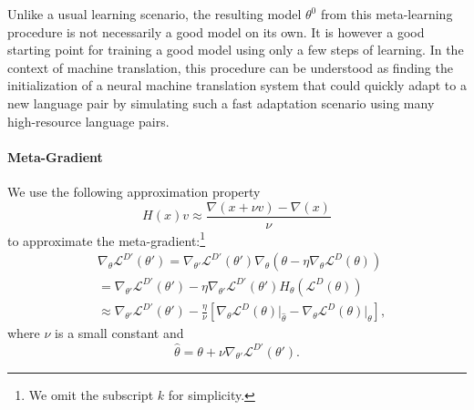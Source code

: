 Unlike a usual learning scenario, the resulting model $\theta^0$ from this meta-learning procedure is not necessarily a good model on its own. It is however a good starting point for training a good model using only a few steps of learning. In the context of machine translation, this procedure can be understood as finding the initialization of a neural machine translation system that could quickly adapt to a new language pair by simulating such a fast adaptation scenario using many high-resource language pairs. 



\paragraph{Meta-Gradient}

We use the following approximation property 
\begin{equation}
H(x)v \approx \frac{\nabla(x+\nu v) - \nabla(x)}{\nu}
\end{equation}
to approximate the meta-gradient:\footnote{We omit the subscript $k$ for simplicity.}
\begin{equation}
\begin{split}
	  &\nabla_\theta  \mathcal{L}^{D'}(\theta') = \nabla_{\theta'} \mathcal{L}^{D'}(\theta') 
    \nabla_{\theta}(\theta - \eta \nabla_{\theta} \mathcal{L}^{D}(\theta)) \\
    &= \nabla_{\theta'} \mathcal{L}^{D'}(\theta')
    - \eta \nabla_{\theta'} \mathcal{L}^{D'}(\theta') H_{\theta}(\mathcal{L}^{D}(\theta)) \\
    &\approx 
    \nabla_{\theta'} \mathcal{L}^{D'}(\theta')
    - \frac{\eta}{\nu} \left[
    \nabla_{\theta}\mathcal{L}^D(\theta)\bigg|_{\hat{\theta}}
    - \nabla_{\theta}\mathcal{L}^D(\theta)\bigg|_{\theta} 
    \right],
\end{split}
\end{equation}
where $\nu$ is a small constant and 
\begin{equation}
	\hat{\theta} = \theta + \nu \nabla_{\theta'}\mathcal{L}^{D'}(\theta').	
\end{equation}

